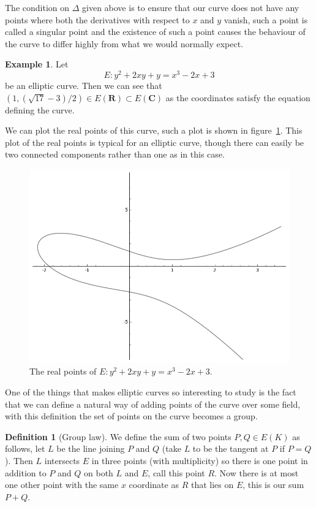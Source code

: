 \documentclass[12pt,a4paper,abstracton,bibtotoc]{scrreprt}
\theoremstyle{definition}
\newtheorem{defn}{Definition}
\newtheorem{ex}{Example}
\newcommand{\RR}{\mathbf{R}}
\newcommand{\CC}{\mathbf{C}}
\begin{document}
The condition on $\Delta$ given above is to ensure that our curve does not have any points where both the derivatives with respect to $x$ and $y$ vanish, such a point is called a singular point and the existence of such a point causes the behaviour of the curve to differ highly from what we would normally expect.

\begin{ex}
Let 
\[
E \colon y^2 + 2xy + y = x^3 - 2x + 3
\]
be an elliptic curve.
Then we can see that $(1,(\sqrt{17}-3)/2)\in E(\RR) \subset E(\CC)$ as the coordinates satisfy the equation defining the curve.

We can plot the real points of this curve, such a plot is shown in figure~\ref{fig:ec}.
This plot of the real points is typical for an elliptic curve, though there can easily be two connected components rather than one as in this case.
\begin{figure}
\centering
\includegraphics[scale=0.6]{sageec}
\caption{\label{fig:ec}The real points of $E \colon y^2 + 2xy + y = x^3 - 2x + 3$.}
\end{figure}
\end{ex}

One of the things that makes elliptic curves so interesting to study is the fact that we can define a natural way of adding points of the curve over some field, with this definition the set of points on the curve becomes a group.

\begin{defn}[Group law]
We define the sum of two points $P,Q\in E(K)$ as follows, let $L$ be the line joining $P$ and $Q$ (take $L$ to be the tangent at $P$ if $P=Q$).
Then $L$ intersects $E$ in three points (with multiplicity) so there is one point in addition to $P$ and $Q$ on both $L$ and $E$, call this point $R$.
Now there is at most one other point with the same $x$ coordinate as $R$ that lies on $E$, this is our sum $P+Q$.
\end{defn}
\end{document}
